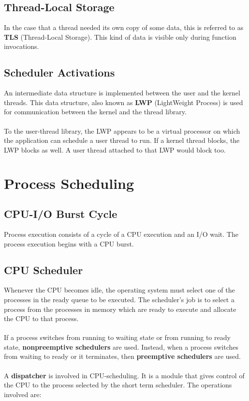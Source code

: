 \documentclass{article}
\begin{document}
\subsection{Thread-Local Storage}
In the case that a thread needed its own copy of some data, this is referred to as \textbf{TLS} (Thread-Local Storage). This kind of data is visible only during function invocations.

\subsection{Scheduler Activations}
An intermediate data structure is implemented between the user and the kernel threads. This data structure, also known as \textbf{LWP} (LightWeight Process) is used for communication between the kernel and the thread library. \\ \\
To the user-thread library, the LWP appears to be a virtual processor on which the application can schedule a user thread to run. If a kernel thread blocks, the LWP blocks as well. A user thread attached to that LWP would block too.

\section{Process Scheduling}
\subsection{CPU-I/O Burst Cycle}
Process execution consists of a cycle of a CPU execution and an I/O wait. The process execution begins with a CPU burst.

\subsection{CPU Scheduler}
Whenever the CPU becomes idle, the operating system must select one of the processes in the ready queue to be executed. The scheduler's job is to select a process from the processes in memory which are ready to execute and allocate the CPU to that process. \\ \\
If a process switches from running to waiting state or from running to ready state, \textbf{nonpreemptive schedulers} are used. Instead, when a process switches from waiting to ready or it terminates, then \textbf{preemptive schedulers} are used. \\ \\
A \textbf{dispatcher} is involved in CPU-scheduling. It is a module that gives control of the CPU to the process selected by the short term scheduler. The operations involved are:
\end{document}
